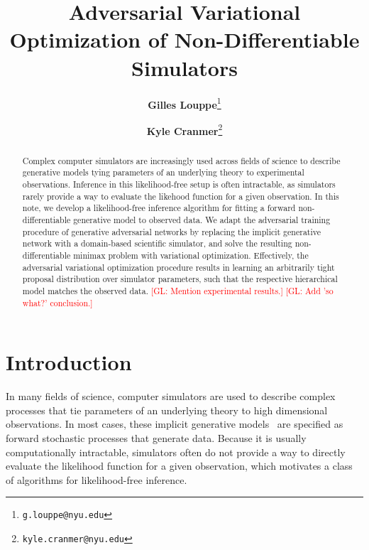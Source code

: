 \documentclass[twocolumn,superscriptaddress,aps]{revtex4-1}
\newcommand{\glnote}[1]{\textcolor{red}{[GL: #1]}}
\theoremstyle{plain}
\begin{document}

\title{\Large{Adversarial Variational Optimization of Non-Differentiable Simulators}}
\vspace{1cm}
\author{\small{\bf Gilles Louppe}\thanks{\texttt{g.louppe@nyu.edu}}}
\author{\small{\bf Kyle Cranmer}\thanks{\texttt{kyle.cranmer@nyu.edu}}}

\begin{abstract}

Complex computer simulators are increasingly used across fields of science to
describe generative models tying parameters of an underlying theory to
experimental observations. Inference in this likelihood-free setup is often
intractable, as simulators rarely provide a way to evaluate the likehood
function for a given observation. In this note, we develop a likelihood-free
inference algorithm for fitting a forward non-differentiable generative model to
observed data. We adapt the adversarial training procedure of generative
adversarial networks by replacing the implicit generative network with a
domain-based scientific simulator, and solve the resulting non-differentiable
minimax problem with variational optimization. Effectively, the adversarial
variational optimization procedure results in learning an arbitrarily tight
proposal distribution over simulator parameters, such that the respective
hierarchical model matches the observed data.
\glnote{Mention experimental results.}
\glnote{Add 'so what?' conclusion.}


\end{abstract}

\maketitle


\section{Introduction}

In many fields of science, computer simulators are used to describe complex
processes that tie parameters of an underlying theory to high dimensional
observations. In most cases, these implicit generative
models~\citep{2016arXiv161003483M} are specified as forward stochastic processes
that generate data. Because it is usually computationally intractable,
simulators often do not provide a way to directly evaluate the likelihood
function for a given observation,  which motivates a class of algorithms for
likelihood-free inference.
\end{document}
